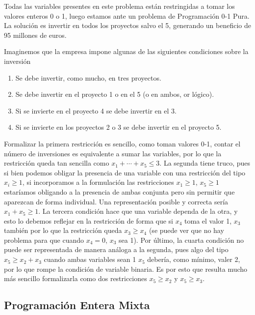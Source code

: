 Todas las variables presentes en este problema están restringidas a tomar los valores enteros 0 o 1, luego estamos ante un
problema de Programación 0-1 Pura. La solución es invertir en todos los proyectos salvo el 5, generando un beneficio de
95 millones de euros.

\vspace*{2mm}

\noindent Imaginemos que la empresa impone algunas de las siguientes condiciones sobre la inversión

\begin{enumerate}
    \item Se debe invertir, como mucho, en tres proyectos.
    \item Se debe invertir en el proyecto 1 o en el 5 (o en ambos, or lógico).
    \item Si se invierte en el proyecto 4 se debe invertir en el 3.
    \item Si se invierte en los proyectos 2 o 3 se debe invertir en el proyecto 5.
\end{enumerate}

Formalizar la primera restricción es sencillo, como toman valores 0-1, contar el número de inversiones es equivalente a sumar
las variables, por lo que la restricción queda tan sencilla como $x_1+\cdots+x_5\leq 3$. La segunda tiene truco, pues si bien
podemos obligar la presencia de una variable con una restricción del tipo $x_i\geq 1$, si incorporamos a la formulación las 
restricciones $x_1\geq 1$, $x_5\geq 1$ estaríamos obligando a la presencia de ambas conjunta pero sin permitir que aparezcan
de forma individual. Una representación posible y correcta sería $x_1+x_5\geq 1$. La tercera condición hace que una variable
dependa de la otra, y esto lo debemos reflejar en la restricción de forma que si $x_4$ toma el valor 1, $x_3$ también por lo
que la restricción queda $x_3\geq x_4$ (se puede ver que no hay problema para que cuando $x_4=0$, $x_3$ sea 1). Por último,
la cuarta condición no puede ser representada de manera análoga a la segunda, pues algo del tipo $x_5\geq x_2+x_3$ cuando 
ambas variables sean 1 $x_5$ debería, como mínimo, valer 2, por lo que rompe la condición de variable binaria. Es por esto
que resulta mucho más sencillo formalizarla como dos restricciones $x_5\geq x_2$ y $x_5\geq x_3$.

\subsection{Programación Entera Mixta}

